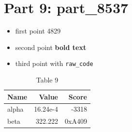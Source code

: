 \documentclass[11pt,a4paper]{article}
\begin{document}
\section{Part 9: part_8537}

\begin{itemize}
  \item first point 4829
  \item second point \textbf{bold text}
  \item third point with \verb|raw_code|
\end{itemize}

\begin{table}[h]
  \centering
  \begin{tabular}{lrr}
    \hline
    Name & Value & Score \\ \hline
    alpha & 16.24e-4 & -3318 \\
    beta & 322.222 & 0xA409 \\ \hline
  \end{tabular}
  \caption{Table 9}
\end{table}
\end{document}
